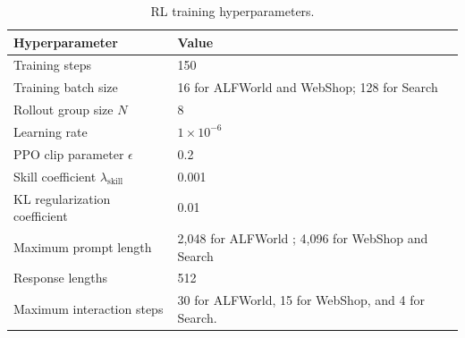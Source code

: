 \begin{table}[t]
\centering
\small
\setlength{\tabcolsep}{6pt}
\renewcommand{\arraystretch}{1.15}
\caption{RL training hyperparameters.}
\label{tab:rl_hyperparameters}
\begin{tabular}{@{}p{}p{}@{}}
\toprule
\textbf{Hyperparameter} & \textbf{Value} \\
\midrule

Training steps
& 150  \\

Training batch size
& 16 for ALFWorld and WebShop; 128 for Search \\

Rollout group size $N$
& 8 \\

Learning rate
& $1\times10^{-6}$  \\

PPO clip parameter $\epsilon$
& 0.2 \\

Skill coefficient $\lambda_{\mathrm{skill}}$
& 0.001 \\

KL regularization coefficient
& 0.01 \\

Maximum prompt length
& 2,048 for ALFWorld ; 4,096 for WebShop and Search  \\

Response lengths
& 512 \\

Maximum interaction steps
& 30 for ALFWorld, 15 for WebShop, and 4 for Search. \\
\bottomrule
\end{tabular}
\end{table}
